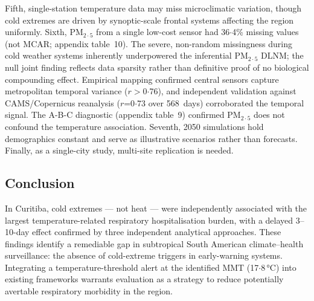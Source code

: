 \documentclass[review,number]{elsarticle}
\begin{document}
Fifth, single-station temperature data may miss microclimatic
variation, though cold extremes are driven by synoptic-scale frontal
systems affecting the region uniformly. Sixth, $\text{PM}_{2{\cdot}5}$
from a single low-cost sensor had 36${\cdot}$4\% missing values (not
MCAR; appendix table~10). The severe, non-random missingness during
cold weather systems inherently underpowered the inferential
$\text{PM}_{2{\cdot}5}$ DLNM; the null joint finding reflects data
sparsity rather than definitive proof of no biological compounding
effect. Empirical mapping confirmed central sensors capture
metropolitan temporal variance ($r$$>$0${\cdot}$76),\cite{daCosta2024}
and independent validation against CAMS/Copernicus reanalysis
($r$=0${\cdot}$73 over 568~days) corroborated the temporal signal.
The A-B-C diagnostic (appendix table~9) confirmed $\text{PM}_{2{\cdot}5}$
does not confound the temperature association.
Seventh, 2050 simulations hold demographics constant and serve as
illustrative scenarios rather than forecasts. Finally, as a
single-city study, multi-site replication is needed.

\subsection{Conclusion}

In Curitiba, cold extremes --- not heat --- were independently
associated with the largest temperature-related respiratory
hospitalisation burden, with a
delayed 3--10-day effect confirmed by three independent analytical
approaches. These findings identify a remediable gap in subtropical
South American climate--health surveillance: the absence of
cold-extreme triggers in early-warning systems. Integrating a
temperature-threshold alert at the identified MMT
(17${\cdot}$8\,°C) into existing frameworks warrants evaluation as a
strategy to reduce potentially avertable respiratory morbidity in
the region.

\end{document}
